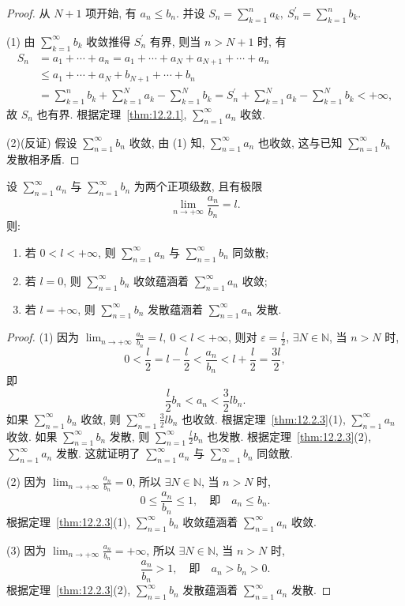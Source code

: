 \begin{proof}
从 $N+1$ 项开始, 有 $a_{n}\leqslant b_{n}$. 并设 $S_{n}=\sum_{k=1}^{n}a_{k},\ S_{n}^{\prime}=\sum_{k=1}^{n}b_{k}$.

(1) 由 $\sum_{k=1}^{\infty}b_{k}$ 收敛推得 $S_{n}^{\prime}$ 有界, 则当 $n>N+1$ 时, 有
\begin{align*}
  S_{n}&=a_{1}+\cdots+a_{n}=a_{1}+\cdots+a_{N}+a_{N+1}+\cdots+a_{n} \\
       &\leqslant a_{1}+\cdots+a_{N}+b_{N+1}+\cdots+b_{n} \\
       &=\sum_{k=1}^{n}b_{k}+\sum_{k=1}^{N}a_{k}-\sum_{k=1}^{N}b_{k}
        =S_{n}^{\prime}+\sum_{k=1}^{N}a_{k}-\sum_{k=1}^{N}b_{k}<+\infty,
\end{align*}
故 $S_{n}$ 也有界. 根据定理~\ref{thm:12.2.1}, $\sum_{n=1}^{\infty}a_{n}$ 收敛.

(2)(反证) 假设 $\sum_{n=1}^{\infty}b_{n}$ 收敛, 由 (1) 知, $\sum_{n=1}^{\infty}a_{n}$ 也收敛, 这与已知 $\sum_{n=1}^{\infty}b_{n}$ 发散相矛盾.
\end{proof}

\begin{theoremp}[比较判别法的极限形式]\label{thm:12.2.3p}
设 $\sum_{n=1}^{\infty}a_{n}$ 与 $\sum_{n=1}^{\infty}b_{n}$ 为两个正项级数, 且有极限
\[
  \lim_{n\to+\infty}\frac{a_{n}}{b_{n}}=l.
\]
则:
\begin{enumerate}
  \item 若 $0<l<+\infty$, 则 $\sum_{n=1}^{\infty}a_{n}$ 与 $\sum_{n=1}^{\infty}b_{n}$ 同敛散;
  \item 若 $l=0$, 则 $\sum_{n=1}^{\infty}b_{n}$ 收敛蕴涵着 $\sum_{n=1}^{\infty}a_{n}$ 收敛;
  \item 若 $l=+\infty$, 则 $\sum_{n=1}^{\infty}b_{n}$ 发散蕴涵着 $\sum_{n=1}^{\infty}a_{n}$ 发散.
\end{enumerate}
\end{theoremp}

\begin{proof}
(1) 因为 $\lim_{n\to+\infty}\frac{a_{n}}{b_{n}}=l,\ 0<l<+\infty$, 则对 $\varepsilon=\frac{l}{2}$, $\exists N\in\mathbb{N}$, 当 $n>N$ 时,
\[
  0<\frac{l}{2}=l-\frac{l}{2}<\frac{a_{n}}{b_{n}}<l+\frac{l}{2}=\frac{3l}{2},
\]
即
\[
  \frac{l}{2}b_{n}<a_{n}<\frac{3}{2}lb_{n}.
\]
如果 $\sum_{n=1}^{\infty}b_{n}$ 收敛, 则 $\sum_{n=1}^{\infty}\frac{3}{2}lb_{n}$ 也收敛. 根据定理~\ref{thm:12.2.3}(1), $\sum_{n=1}^{\infty}a_{n}$ 收敛. 如果 $\sum_{n=1}^{\infty}b_{n}$ 发散, 则 $\sum_{n=1}^{\infty}\frac{l}{2}b_{n}$ 也发散. 根据定理~\ref{thm:12.2.3}(2), $\sum_{n=1}^{\infty}a_{n}$ 发散. 这就证明了 $\sum_{n=1}^{\infty}a_{n}$ 与 $\sum_{n=1}^{\infty}b_{n}$ 同敛散.

(2) 因为 $\lim_{n\to+\infty}\frac{a_{n}}{b_{n}}=0$, 所以 $\exists N\in\mathbb{N}$, 当 $n>N$ 时,
\[
  0\leqslant\frac{a_{n}}{b_{n}}\leqslant1,\quad\text{即}\quad a_{n}\leqslant b_{n}.
\]
根据定理~\ref{thm:12.2.3}(1), $\sum_{n=1}^{\infty}b_{n}$ 收敛蕴涵着 $\sum_{n=1}^{\infty}a_{n}$ 收敛.

(3) 因为 $\lim_{n\to+\infty}\frac{a_{n}}{b_{n}}=+\infty$, 所以 $\exists N\in\mathbb{N}$, 当 $n>N$ 时,
\[
  \frac{a_{n}}{b_{n}}>1,\quad\text{即}\quad a_{n}>b_{n}>0.
\]
根据定理~\ref{thm:12.2.3}(2), $\sum_{n=1}^{\infty}b_{n}$ 发散蕴涵着 $\sum_{n=1}^{\infty}a_{n}$ 发散.
\end{proof}

